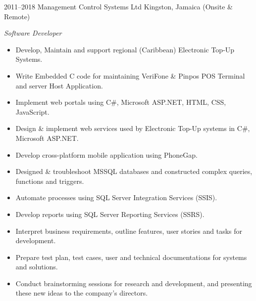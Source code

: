 \documentclass[]{friggeri-cvRS}
\begin{document}
\begin{entrylist}
{\begin{itemize}
    \end{itemize}}
  \entry
    {2011--2018}
    {Management Control Systems Ltd}
    {Kingston, Jamaica (Onsite \& Remote)}
    {\emph{Software Developer}
    \begin{itemize}
	\item Develop, Maintain and support regional (Caribbean) Electronic Top-Up Systems.
	\item Write Embedded C code for maintaining VeriFone \& Pinpos POS Terminal and server Host Application.
	\item Implement web portals using C\#, Microsoft ASP.NET, HTML, CSS, JavaScript.
	\item Design \& implement web services used by Electronic Top-Up systems in C\#, Microsoft ASP.NET.
	\item Develop cross-platform mobile application using PhoneGap.
	\item Designed \& troubleshoot MSSQL databases and constructed complex queries, functions and triggers.
	\item Automate processes using SQL Server Integration Services (SSIS).
	\item Develop reports using SQL Server Reporting Services (SSRS).
	\item Interpret business requirements, outline features, user stories and tasks for development.
	\item Prepare test plan, test cases, user and technical documentations for systems and solutions.
	\item Conduct brainstorming sessions for research and development, and presenting these new ideas to the company's directors.\\
	 
    \end{itemize}}
\end{entrylist}
\newpage
\end{document}
